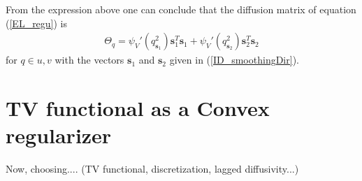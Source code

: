 From the expression above one can conclude that the diffusion matrix of equation (\ref{EL_regu}) is 
\begin{align}
\Theta_q = \psi_V'(q_{\textbf{s}_1}^2) \textbf{s}_1^T \textbf{s}_1 + \psi_V'(q_{\textbf{s}_2}^2) \textbf{s}_2^T \textbf{s}_2
\end{align}
for $q \in u, v$ with the vectors $\textbf{s}_1$ and $\textbf{s}_2$ given in (\ref{ID_smoothingDir}).

\section{TV functional as a Convex regularizer}
Now, choosing.... (TV functional, discretization, lagged diffusivity...)
